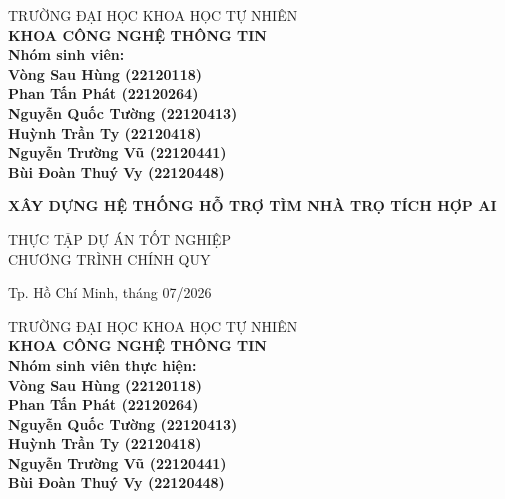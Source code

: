 \begin{titlepage}

\begin{center}
TRƯỜNG ĐẠI HỌC KHOA HỌC TỰ NHIÊN\\
\textbf{KHOA CÔNG NGHỆ THÔNG TIN}\\[2cm]


{ \bfseries Nhóm sinh viên:\\
Vòng Sau Hùng (22120118) \\
Phan Tấn Phát (22120264) \\
Nguyễn Quốc Tường (22120413) \\
Huỳnh Trần Ty (22120418) \\
Nguyễn Trường Vũ (22120441) \\
Bùi Đoàn Thuý Vy (22120448) \\[2cm]}


{ \normalsize \bfseries XÂY DỰNG HỆ THỐNG HỖ TRỢ TÌM NHÀ TRỌ TÍCH HỢP AI \\[3cm]}


\normalsize THỰC TẬP DỰ ÁN TỐT NGHIỆP\\
\normalsize CHƯƠNG TRÌNH CHÍNH QUY\\[2cm]



\vfill
Tp. Hồ Chí Minh, tháng 07/2026

\end{center}

\pagebreak



\begin{center}

TRƯỜNG ĐẠI HỌC KHOA HỌC TỰ NHIÊN\\
\textbf{KHOA CÔNG NGHỆ THÔNG TIN}\\[2cm]


{\bfseries Nhóm sinh viên thực hiện:\\
Vòng Sau Hùng (22120118)\\
Phan Tấn Phát (22120264)\\
Nguyễn Quốc Tường (22120413)\\
Huỳnh Trần Ty (22120418)\\
Nguyễn Trường Vũ (22120441)\\
Bùi Đoàn Thuý Vy (22120448)\\[1.5cm] }



\end{center}
\end{titlepage}
